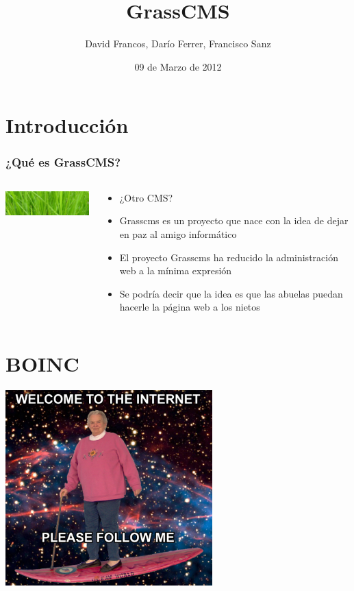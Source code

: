 \documentclass[utf8]{beamer}
\title{GrassCMS}
\author{David Francos, Darío Ferrer, Francisco Sanz}
\date{09 de Marzo de 2012}
\begin{document}
\frame{\titlepage}

\section{Introducción}
\begin{frame}
	\frametitle{¿Qué es GrassCMS?}
	\begin{columns}
	\begin{column}{6cm}
		\includegraphics[width=5cm]{images/grass.jpg}
	\end{column}
	\begin{column}{6cm}
		\begin{itemize}
			\item<1->{¿Otro CMS?}
			\item<2->{Grasscms es un proyecto que nace con la idea de dejar en paz al amigo informático}
			\item<3->{El proyecto Grasscms ha reducido la administración web a la mínima expresión}
			\item<4->{Se podría decir que la idea es que las abuelas puedan hacerle la página web a los nietos}
		\end{itemize}
	\end{column}
	\end{columns}
\end{frame}
\section{BOINC}
\begin{frame}
\begin{center}
			\includegraphics[width=8cm]{images/welcome.png}
\end{center}
\end{frame}
\end{document}
